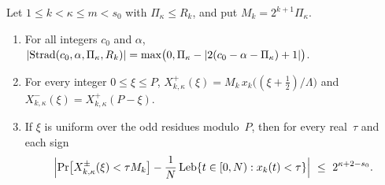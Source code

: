 \begin{lemma}\label{lem:dnp-transfer}
Let $1\le k<\kappa\le m<s_0$ with $\Pi_\kappa\le R_k$, and put $M_k=2^{k+1}\Pi_\kappa$.
\begin{enumerate}[label=(\alph*)]
\item For all integers $c_0$ and $\alpha$,
  $\lvert \mathrm{Strad}(c_0,\alpha,\Pi_\kappa,R_k) \rvert=\max\bigl(0,\Pi_\kappa-\lvert 2(c_0-\alpha-\Pi_\kappa)+1 \rvert\bigr)$.
\item For every integer $0\le\xi\le P$, $X^+_{k,\kappa}(\xi)=M_k\,x_k\bigl((\xi+\frac12)/\Lambda\bigr)$ and
  $X^-_{k,\kappa}(\xi)=X^+_{k,\kappa}(P-\xi)$.
\item If $\xi$ is uniform over the odd residues modulo~$P$, then for every real~$\tau$ and each sign
  \[
    \Bigl|\Pr\bigl[X^\pm_{k,\kappa}(\xi)<\tau M_k\bigr]-\frac1N\,\mathrm{Leb}\{t\in[0,N):x_k(t)<\tau\}\Bigr|
    \ \le\ 2^{\kappa+2-s_0}.
  \]
\end{enumerate}
\end{lemma}

